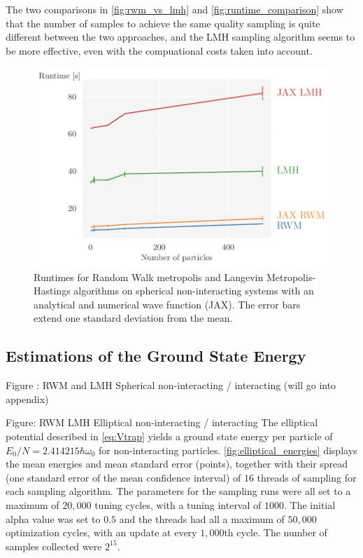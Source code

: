 The two comparisons in \autoref{fig:rwm_vs_lmh} and \autoref{fig:runtime_comparison} show that the number of samples to achieve the same quality sampling is quite different between the two approaches, and the LMH sampling algorithm seems to be more effective, even with the compuational costs taken into account. 

\begin{figure}[!htb]
\begin{center}\includegraphics[width=\textwidth]{latex/figures/runtime_comparisons.pdf}
\end{center}
\caption{Runtimes for Random Walk metropolis and Langevin Metropolis-Hastings algorithms on spherical non-interacting systems with an analytical and numerical wave function (JAX). The error bars extend one standard deviation from the mean.}
\label{fig:runtime_comparison}
\end{figure}

\subsection{Estimations of the Ground State Energy}

Figure : RWM and LMH Spherical non-interacting / interacting (will go into appendix)

Figure: RWM LMH Elliptical non-interacting / interacting  
The elliptical potential described in \autoref{eq:Vtrap} yields a ground state energy per particle of $E_0/N = 2.414215 \hbar\omega_0$ for non-interacting particles. \autoref{fig:elliptical_energies} displays the mean energies and mean standard error (points), together with their spread (one standard error of the mean confidence interval)  of $16$ threads of sampling for each sampling algorithm. The parameters for the sampling runs were all set to a maximum of $20,000$ tuning cycles, with a tuning interval of $1000$. The initial alpha value was set to $0.5$ and the threads had all a maximum of $50,000$ optimization cycles, with an update at every $1,000$th cycle. The number of samples collected were $2^{15}$. 

